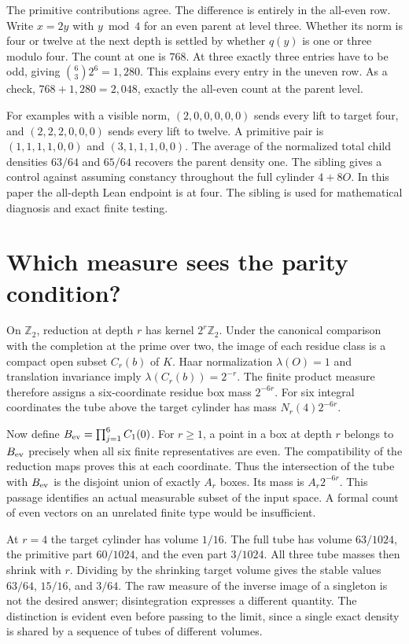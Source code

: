 \documentclass[12pt,letterpaper]{article}
\begin{document}
The primitive contributions agree. The difference is entirely in the all-even row. Write $x=2y$ with $y\bmod4$ for an even parent at level three. Whether its norm is four or twelve at the next depth is settled by whether $q(y)$ is one or three modulo four. The count at one is $768$. At three exactly three entries have to be odd, giving $\binom63 2^6=1,280$. This explains every entry in the uneven row. As a check, $768+1,280=2,048$, exactly the all-even count at the parent level.

For examples with a visible norm, $(2,0,0,0,0,0)$ sends every lift to target four, and $(2,2,2,0,0,0)$ sends every lift to twelve. A primitive pair is $(1,1,1,1,0,0)$ and $(3,1,1,1,0,0)$. The average of the normalized total child densities $63/64$ and $65/64$ recovers the parent density one. The sibling gives a control against assuming constancy throughout the full cylinder $4+8O$. In this paper the all-depth Lean endpoint is at four. The sibling is used for mathematical diagnosis and exact finite testing.

\section{Which measure sees the parity condition?}
On $\mathbb Z_2$, reduction at depth $r$ has kernel $2^r\mathbb Z_2$. Under the canonical comparison with the completion at the prime over two, the image of each residue class is a compact open subset $C_r(b)$ of $K$. Haar normalization $\lambda(O)=1$ and translation invariance imply $\lambda(C_r(b))=2^{-r}$. The finite product measure therefore assigns a six-coordinate residue box mass $2^{-6r}$. For six integral coordinates the tube above the target cylinder has mass $N_r(4)2^{-6r}$.

Now define $B_{\rm ev}=\prod_{j=1}^6 C_1(0)$. For $r\ge1$, a point in a box at depth $r$ belongs to $B_{\rm ev}$ precisely when all six finite representatives are even. The compatibility of the reduction maps proves this at each coordinate. Thus the intersection of the tube with $B_{\rm ev}$ is the disjoint union of exactly $A_r$ boxes. Its mass is $A_r2^{-6r}$. This passage identifies an actual measurable subset of the input space. A formal count of even vectors on an unrelated finite type would be insufficient.

At $r=4$ the target cylinder has volume $1/16$. The full tube has volume $63/1024$, the primitive part $60/1024$, and the even part $3/1024$. All three tube masses then shrink with $r$. Dividing by the shrinking target volume gives the stable values $63/64$, $15/16$, and $3/64$. The raw measure of the inverse image of a singleton is not the desired answer; disintegration expresses a different quantity. The distinction is evident even before passing to the limit, since a single exact density is shared by a sequence of tubes of different volumes.
\end{document}
